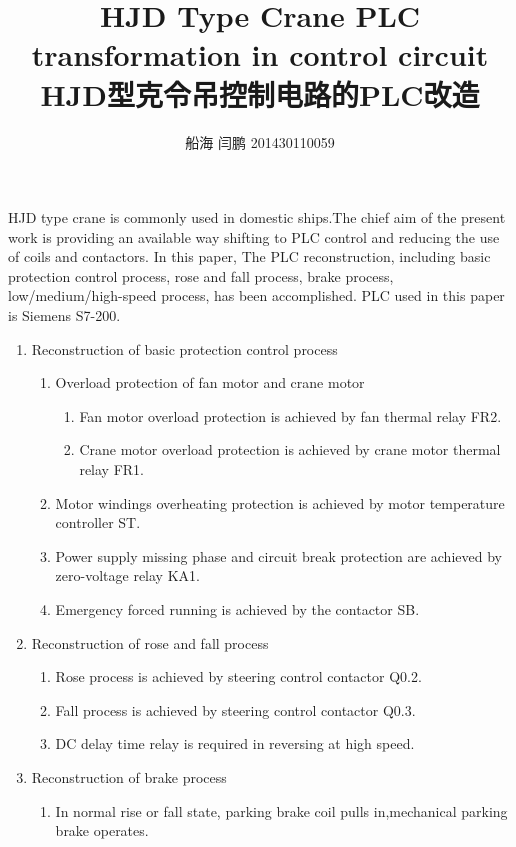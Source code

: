 \documentclass[a4paper,10.5pt]{article}
\begin{document}
\title{HJD Type Crane PLC transformation in control circuit \\
{ HJD型克令吊控制电路的PLC改造}}
\author{ 船海 闫鹏 201430110059}
\date{}
\maketitle 
\noindent
HJD type crane is commonly used in domestic ships.The chief aim of the present work is providing an available way shifting to PLC control and reducing the use of coils and contactors. In this paper, The PLC reconstruction, including basic protection control process, rose and fall process, brake process, low/medium/high-speed process, has been accomplished. PLC used in this paper is Siemens S7-200.
\begin{enumerate}
\item Reconstruction of basic protection control process	
	\begin{enumerate}
\item Overload protection of fan motor and crane motor
		\begin{enumerate}
\item Fan motor overload protection is achieved  by fan thermal relay FR2.
\item Crane motor overload protection is achieved  by crane motor thermal relay FR1.
		\end{enumerate}
\item Motor windings overheating protection is achieved by  motor temperature controller ST.
\item Power supply missing phase and circuit break protection are achieved by  zero-voltage relay KA1.
\item Emergency forced running is achieved by the contactor SB.
	\end{enumerate}
\item Reconstruction of rose and fall process
	\begin{enumerate}
\item Rose process  is achieved by steering control contactor Q0.2.
\item Fall process is  achieved by steering control contactor Q0.3.
\item DC delay time relay is required in reversing at high speed.
	\end{enumerate}
\item Reconstruction of brake process
	\begin{enumerate} 
\item In normal rise or fall state, parking brake   coil pulls in,mechanical parking brake operates.

\end{enumerate}
\end{enumerate}
\end{document}
